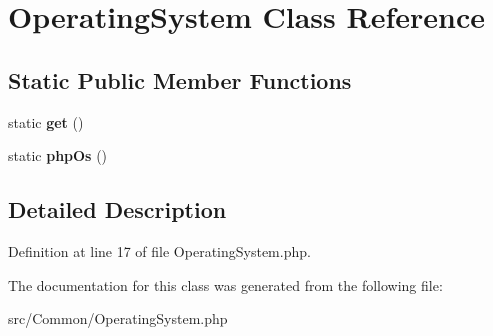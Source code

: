 \hypertarget{class_zest_1_1_common_1_1_operating_system}{}\section{Operating\+System Class Reference}
\label{class_zest_1_1_common_1_1_operating_system}
\subsection*{Static Public Member Functions}
\begin{DoxyCompactItemize}
\item 
\mbox{\label{class_zest_1_1_common_1_1_operating_system_a5ba61361bf0695a285bbaefefc427191}} 
static {\bfseries get} ()
\item 
\mbox{\label{class_zest_1_1_common_1_1_operating_system_acc491dc6aeba6f67675d2a6ea2e50959}} 
static {\bfseries php\+Os} ()
\end{DoxyCompactItemize}


\subsection{Detailed Description}


Definition at line 17 of file Operating\+System.\+php.



The documentation for this class was generated from the following file\+:\begin{DoxyCompactItemize}
\item 
src/\+Common/Operating\+System.\+php\end{DoxyCompactItemize}
